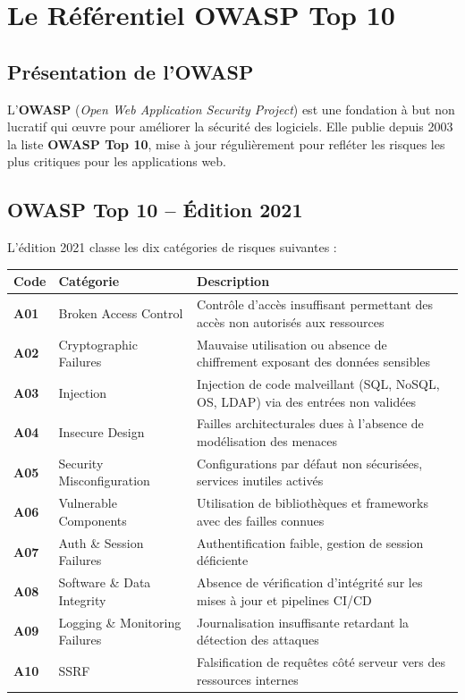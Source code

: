 \documentclass[12pt, a4paper]{report}
\begin{document}
\section{Le Référentiel OWASP Top 10}

\subsection{Présentation de l'OWASP}

L'\textbf{OWASP} (\textit{Open Web Application Security Project}) est une fondation
à but non lucratif qui œuvre pour améliorer la sécurité des logiciels. Elle publie
depuis 2003 la liste \textbf{OWASP Top 10}, mise à jour régulièrement pour refléter
les risques les plus critiques pour les applications web.

\subsection{OWASP Top 10 -- Édition 2021}

L'édition 2021 classe les dix catégories de risques suivantes :

\begin{center}
\begin{tabular}{>{\bfseries\centering\arraybackslash}p{1.2cm}
                >{\raggedright\arraybackslash}p{4.5cm}
                >{\raggedright\arraybackslash}p{7cm}}
  \toprule
  \textcolor{primaryblue}{Code} &
  \textcolor{primaryblue}{Catégorie} &
  \textcolor{primaryblue}{Description} \\
  \midrule
  A01 & Broken Access Control
      & Contrôle d'accès insuffisant permettant des accès non autorisés aux ressources \\[3pt]
  A02 & Cryptographic Failures
      & Mauvaise utilisation ou absence de chiffrement exposant des données sensibles \\[3pt]
  A03 & Injection
      & Injection de code malveillant (SQL, NoSQL, OS, LDAP) via des entrées non validées \\[3pt]
  A04 & Insecure Design
      & Failles architecturales dues à l'absence de modélisation des menaces \\[3pt]
  A05 & Security Misconfiguration
      & Configurations par défaut non sécurisées, services inutiles activés \\[3pt]
  A06 & Vulnerable Components
      & Utilisation de bibliothèques et frameworks avec des failles connues \\[3pt]
  A07 & Auth \& Session Failures
      & Authentification faible, gestion de session déficiente \\[3pt]
  A08 & Software \& Data Integrity
      & Absence de vérification d'intégrité sur les mises à jour et pipelines CI/CD \\[3pt]
  A09 & Logging \& Monitoring Failures
      & Journalisation insuffisante retardant la détection des attaques \\[3pt]
  A10 & SSRF
      & Falsification de requêtes côté serveur vers des ressources internes \\
  \bottomrule
\end{tabular}
\end{center}
\end{document}
